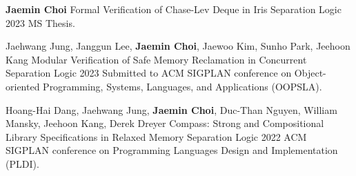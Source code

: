

\begin{cventries}

  \cventry
    {\textbf{Jaemin Choi}} %
    {Formal Verification of Chase-Lev Deque in Iris Separation Logic} %
    {} %
    {2023} %
    {
      MS Thesis.
    }

  \cventry
    {Jaehwang Jung, Janggun Lee, \textbf{Jaemin Choi}, Jaewoo Kim, Sunho Park, Jeehoon Kang} %
    {Modular Verification of Safe Memory Reclamation in Concurrent Separation Logic} %
    {} %
    {2023} %
    {
      Submitted to ACM SIGPLAN conference on Object-oriented Programming, Systems, Languages, and Applications (OOPSLA).
    }

  \cventry
    {Hoang-Hai Dang, Jaehwang Jung, \textbf{Jaemin Choi}, Duc-Than Nguyen, William Mansky, Jeehoon Kang, Derek Dreyer} %
    {Compass: Strong and Compositional Library Specifications in Relaxed Memory Separation Logic} %
    {} %
    {2022} %
    {
      ACM SIGPLAN conference on Programming Languages Design and Implementation (PLDI).
    }


\end{cventries}
